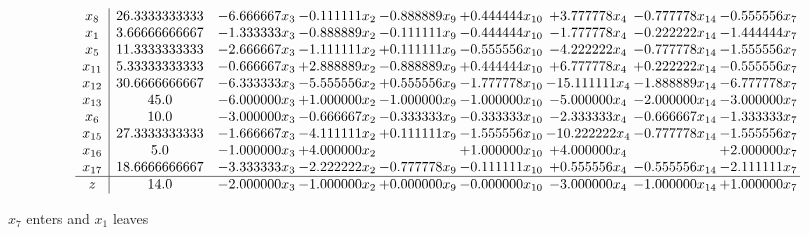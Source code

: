 \documentclass[10pt]{article}
\begin{document}
 \[\begin{array}{c| c c@{\hskip 2pt} c@{\hskip 2pt} c@{\hskip 2pt} c@{\hskip 2pt} c@{\hskip 2pt} c@{\hskip 2pt} c@{\hskip 2pt} }
 x_{8}   &  26.3333333333 & -6.666667 x_{3} & -0.111111 x_{2} & -0.888889 x_{9} & + 0.444444 x_{10} & + 3.777778 x_{4} & -0.777778 x_{14} & -0.555556 x_{7}\\
 x_{1}   &  3.66666666667 & -1.333333 x_{3} & -0.888889 x_{2} & -0.111111 x_{9} & -0.444444 x_{10} & -1.777778 x_{4} & -0.222222 x_{14} & -1.444444 x_{7}\\
 x_{5}   &  11.3333333333 & -2.666667 x_{3} & -1.111111 x_{2} & + 0.111111 x_{9} & -0.555556 x_{10} & -4.222222 x_{4} & -0.777778 x_{14} & -1.555556 x_{7}\\
 x_{11}   &  5.33333333333 & -0.666667 x_{3} & + 2.888889 x_{2} & -0.888889 x_{9} & + 0.444444 x_{10} & + 6.777778 x_{4} & + 0.222222 x_{14} & -0.555556 x_{7}\\
 x_{12}   &  30.6666666667 & -6.333333 x_{3} & -5.555556 x_{2} & + 0.555556 x_{9} & -1.777778 x_{10} & -15.111111 x_{4} & -1.888889 x_{14} & -6.777778 x_{7}\\
 x_{13}   &  45.0 & -6.000000 x_{3} & + 1.000000 x_{2} & -1.000000 x_{9} & -1.000000 x_{10} & -5.000000 x_{4} & -2.000000 x_{14} & -3.000000 x_{7}\\
 x_{6}   &  10.0 & -3.000000 x_{3} & -0.666667 x_{2} & -0.333333 x_{9} & -0.333333 x_{10} & -2.333333 x_{4} & -0.666667 x_{14} & -1.333333 x_{7}\\
 x_{15}   &  27.3333333333 & -1.666667 x_{3} & -4.111111 x_{2} & + 0.111111 x_{9} & -1.555556 x_{10} & -10.222222 x_{4} & -0.777778 x_{14} & -1.555556 x_{7}\\
 x_{16}   &  5.0 & -1.000000 x_{3} & + 4.000000 x_{2} &   & + 1.000000 x_{10} & + 4.000000 x_{4} &   & + 2.000000 x_{7}\\
 x_{17}   &  18.6666666667 & -3.333333 x_{3} & -2.222222 x_{2} & -0.777778 x_{9} & -0.111111 x_{10} & + 0.555556 x_{4} & -0.555556 x_{14} & -2.111111 x_{7}\\
\hline
z    &  14.0 & -2.000000 x_{3} & -1.000000 x_{2} & + 0.000000 x_{9} & -0.000000 x_{10} & -3.000000 x_{4} & -1.000000 x_{14} & + 1.000000 x_{7}\\
\end{array}\]


 $ x_{7} $ enters and $ x_{1} $ leaves 
\end{document}
